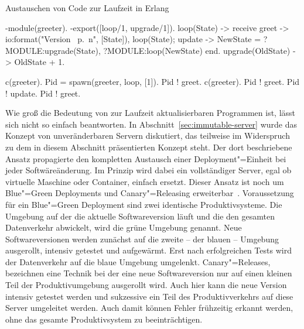 \begin{program}[!hbt]
\caption{Austauschen von Code zur Laufzeit in Erlang}
\label{prog:erlang-hot-code-loading}
\noindent\begin{minipage}[t]{.49\textwidth}
\lstset{showlines=true}
\begin{ErlangCode}
-module(greeter).
-export([loop/1, upgrade/1]).
loop(State) -> receive
  greet -> 
    io:format("Version ~p.~n",
						  [State]),
    loop(State);
  update ->
    NewState = 
			?MODULE:upgrade(State),
    ?MODULE:loop(NewState)
end.
upgrade(OldState) -> 
  OldState + 1.
\end{ErlangCode}

\end{minipage}\hfill
\begin{minipage}[t]{.48\textwidth}
\lstset{showlines=true}
\begin{ErlangCode}
c(greeter).
Pid = spawn(greeter, loop, [1]).
Pid ! greet. %
c(greeter).
Pid ! greet. %
Pid ! update.
Pid ! greet. %






\end{ErlangCode}

\end{minipage}
\end{program}

Wie groß die Bedeutung von zur Laufzeit aktualisierbaren Programmen ist, lässt sich nicht so einfach beantworten. In Abschnitt~\ref{sec:immutable-server} wurde das Konzept von unveränderbaren Servern diskutiert, das teilweise im Widerspruch zu dem in diesem Abschnitt präsentierten Konzept steht. Der dort beschriebene Ansatz propagierte den kompletten Austausch einer Deployment"=Einheit bei jeder Softwäreänderung. Im Prinzip wird dabei ein vollständiger Server, egal ob virtuelle Maschine oder Container, einfach ersetzt. Dieser Ansatz ist noch um Blue"=Green Deployments und Canary"=Releasing erweiterbar~\cite[261-265]{Humble:2010:CDR:1869904}. Voraussetzung für ein Blue"=Green Deployment sind zwei identische Produktivsysteme. Die Umgebung auf der die aktuelle Softwareversion läuft und die den gesamten Datenverkehr abwickelt, wird die grüne Umgebung genannt. Neue Softwareversionen werden zunächst auf die zweite -- der blauen -- Umgebung ausgerollt, intensiv getestet und aufgewärmt. Erst nach erfolgreichen Tests wird der Datenverkehr auf die blaue Umgebung umgelenkt. Canary"=Releases, bezeichnen eine Technik bei der eine neue Softwareversion nur auf einen kleinen Teil der Produktivumgebung ausgerollt wird. Auch hier kann die neue Version intensiv getestet werden und sukzessive ein Teil des Produktivverkehrs auf diese Server umgeleitet werden. Auch damit können Fehler frühzeitig erkannt werden, ohne das gesamte Produktivsystem zu beeinträchtigen.

